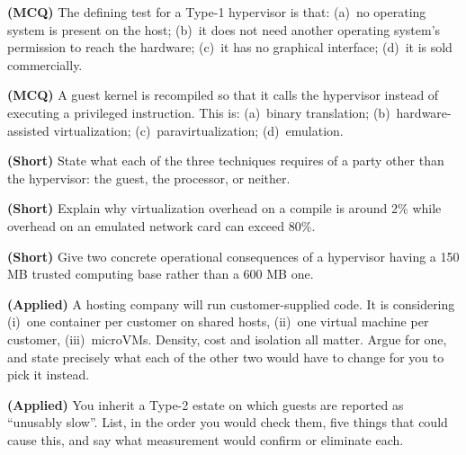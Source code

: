 \begin{reviewq}
  \item \textbf{(MCQ)} The defining test for a Type-1 hypervisor is that:
        (a)~no operating system is present on the host; (b)~it does not need
        another operating system's permission to reach the hardware; (c)~it has
        no graphical interface; (d)~it is sold commercially.
  \item \textbf{(MCQ)} A guest kernel is recompiled so that it calls the
        hypervisor instead of executing a privileged instruction. This is:
        (a)~binary translation; (b)~hardware-assisted virtualization;
        (c)~paravirtualization; (d)~emulation.
  \item \textbf{(Short)} State what each of the three techniques requires of a
        party other than the hypervisor: the guest, the processor, or neither.
  \item \textbf{(Short)} Explain why virtualization overhead on a compile is
        around 2\% while overhead on an emulated network card can exceed 80\%.
  \item \textbf{(Short)} Give two concrete operational consequences of a
        hypervisor having a 150 MB trusted computing base rather than a 600 MB
        one.
  \item \textbf{(Applied)} A hosting company will run customer-supplied code.
        It is considering (i)~one container per customer on shared hosts,
        (ii)~one virtual machine per customer, (iii)~microVMs. Density, cost
        and isolation all matter. Argue for one, and state precisely what each
        of the other two would have to change for you to pick it instead.
  \item \textbf{(Applied)} You inherit a Type-2 estate on which guests are
        reported as ``unusably slow''. List, in the order you would check them,
        five things that could cause this, and say what measurement would
        confirm or eliminate each.
\end{reviewq}
